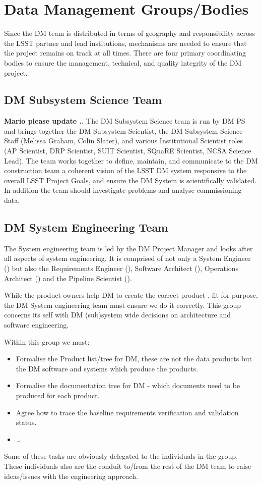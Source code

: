 \section{Data Management Groups/Bodies} \label{sect:groups}
Since the DM team is distributed in terms of geography and responsibility across the LSST partner and lead institutions, mechanisms are needed to ensure that the project remains on track at all times.  There are four primary coordinating bodies to ensure the management, technical, and quality integrity of the DM project.

\subsection{DM Subsystem Science Team \label{sect:dmsst}}
{\bf Mario  please update ..}
The DM Subsystem Science team is run by DM PS and brings together the DM Subsystem Scientist, the DM Subsystem Science Staff (Melissa Graham, Colin Slater), and various Institutional Scientist roles (AP Scientist, DRP Scientist, SUIT Scientist, SQuaRE Scientist, NCSA Science Lead).
The team works together to define, maintain, and communicate to the DM construction team a coherent vision of the LSST DM system responsive to the overall LSST Project Goals, and ensure the DM System is scientifically validated. In addition the team should  investigate problems and analyse commissioning data.

\subsection{DM System Engineering Team \label{sect:sysengt}}
The System engineering team is led by the DM Project Manager and looks
after all aspects of system engineering. It is comprised of not only a System Engineer () but also the Requirements Engineer (), Software Architect (), Operations Architect () and the Pipeline Scientist ().

While the product owners help DM to create the correct product , fit for purpose, the DM System engineering team must ensure we do it correctly. This group concerns its self with DM (sub)system wide decisions on architecture and software engineering.

Within this group we must:
\begin{itemize}
\item Formalise the Product list/tree for DM, these are not the data products but the DM software and systems which produce the products.
\item Formalise the documentation tree for DM - which documents need to be produced for each product.
\item Agree how to trace the baseline requirements verification and validation status.
\item  \ldots
\end{itemize}
 Some of these tasks are obviously delegated to the individuals in the group. These individuals also are the conduit to/from the rest of the DM team to raise ideas/issues with the engineering approach.

